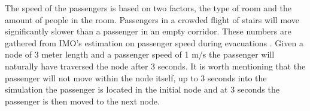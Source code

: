 The speed of the passengers is based on two factors, the type of room and the amount of people in the room. Passengers in a crowded flight of stairs will move significantly slower than a passenger in an empty corridor. These numbers are gathered from IMO's estimation on passenger speed during evacuations \cite{speed}. Given a node of 3 meter length and a passenger speed of 1 m/s the passenger will naturally have traversed the node after 3 seconds. It is worth mentioning that the passenger will not move within the node itself, up to 3 seconds into the simulation the passenger is located in the initial node and at 3 seconds the passenger is then moved to the next node.











